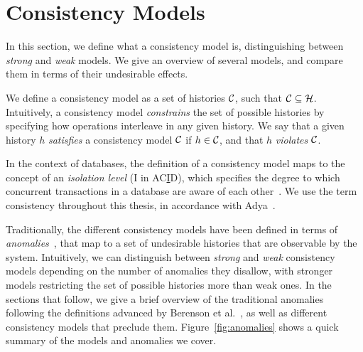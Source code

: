 \section{Consistency Models}

In this section, we define what a consistency model is, distinguishing between \emph{strong} and \emph{weak} models. We give an overview of several models, and compare them in terms of their undesirable effects.

We define a consistency model as a set of histories $\mathcal{C}$, such that $\mathcal{C} \subseteq \mathcal{H}$. Intuitively, a consistency model \emph{constrains} the set of possible histories by specifying how operations interleave in any given history. We say that a given history $h$ \emph{satisfies} a consistency model $\mathcal{C}$ if $h \in \mathcal{C}$, and that $h$ \emph{violates} $\mathcal{C}$.

In the context of databases, the definition of a consistency model maps to the concept of an \emph{isolation level} (I in AC\underline{I}D), which specifies the degree to which concurrent transactions in a database are aware of each other~\citep{adya_thesis}. We use the term consistency throughout this thesis, in accordance with Adya~\citep{adya_thesis}.

Traditionally, the different consistency models have been defined in terms of \emph{anomalies}~\citep{sql-critique}, that map to a set of undesirable histories that are observable by the system. Intuitively, we can distinguish between \emph{strong} and \emph{weak} consistency models depending on the number of anomalies they disallow, with stronger models restricting the set of possible histories more than weak ones. In the sections that follow, we give a brief overview of the traditional anomalies following the definitions advanced by Berenson et al.~\citep{sql-critique}, as well as different consistency models that preclude them. Figure~\ref{fig:anomalies} shows a quick summary of the models and anomalies we cover.

